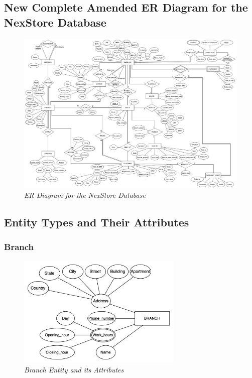 \begin{landscape}
  \section{New Complete Amended ER Diagram for the NexStore Database}
  \begin{figure}[H]
    \centering
    \includegraphics[width=1\textwidth]{images/diagrams/diagram.drawio.png}
    \caption{\textit{ER Diagram for the NexStore Database}}
  \end{figure}
\end{landscape}

\subsection{Entity Types and Their Attributes}

\subsubsection{Branch}
\begin{figure}[H]
  \centering
  \includegraphics[width=0.7\textwidth]{images/entities/branch.png}
  \caption{\textit{Branch Entity and its Attributes}}
\end{figure}

